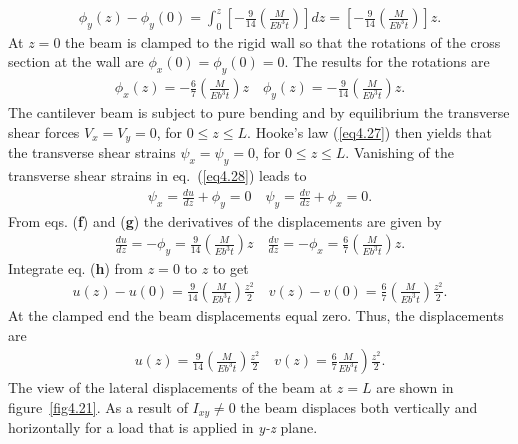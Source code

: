 \documentclass{AeroStructure-ERJohnson}
\begin{document}
\begin{example}
\begin{gather}
\phi_{y}(z)-\phi_{y}(0)=\int_{0}^{z}\left[-\frac{9}{14}\left(\frac{M}{E b^{3} t}\right)\right] d z=\left[-\frac{9}{14}\left(\frac{M}{E b^{3} t}\right)\right] z.\label{ex4.5e}
\end{gather}
At $z = $0 the beam is clamped to the rigid wall so that the rotations of the cross section at the wall are $\phi_{x}(0)=\phi_{y}(0)=0$. The results for the rotations are
\begin{align}\label{ex4.5f}
\phi_{x}(z)=-\frac{6}{7}\left(\frac{M}{E b^{3} t}\right) z \quad \phi_{y}(z)=-\frac{9}{14}\left(\frac{M}{E b^{3} t}\right) z.
\end{align}
The cantilever beam is subject to pure bending and by equilibrium the transverse shear forces $V_{x}=V_{y}=0$, for $0 \leq z \leq L$. Hooke's law (\ref{eq4.27}) then yields that the transverse shear strains $\psi_{x}=\psi_{y}=0$, for $0 \leq z \leq L$. Vanishing of the transverse shear strains in eq.~(\ref{eq4.28}) leads to
\begin{align}\label{ex4.5g}
\psi_{x}=\frac{d u}{d z}+\phi_{y}=0 \quad \psi_{y}=\frac{d v}{d z}+\phi_{x}=0.
\end{align}
From eqs. (\textbf{f}) and (\textbf{g}) the derivatives of the displacements are given by
\begin{align}\label{ex4.5h}
\frac{d u}{d z}=-\phi_{y}=\frac{9}{14}\left(\frac{M}{E b^{3} t}\right) z \quad \frac{d v}{d z}=-\phi_{x}=\frac{6}{7}\left(\frac{M}{E b^{3} t}\right) z.
\end{align}
Integrate eq. (\textbf{h}) from $z=0$ to $z$ to get
\begin{align}\label{ex4.5i}
u(z)-u(0)=\frac{9}{14}\left(\frac{M}{E b^{3} t}\right) \frac{z^{2}}{2} \quad v(z)-v(0)=\frac{6}{7}\left(\frac{M}{E b^{3} t}\right) \frac{z^{2}}{2}.
\end{align}
At the clamped end the beam displacements equal zero. Thus, the displacements are
\begin{align}\label{ex4.5j}
\left.u(z)=\frac{9}{14}\left(\frac{M}{E b^{3} t}\right) \frac{z^{2}}{2} \quad v(z)=\frac{6}{7} \frac{M}{E b^{3} t}\right) \frac{z^{2}}{2}.
\end{align}
The view of the lateral displacements of the beam at $z=L$ are shown in figure~\ref{fig4.21}. As a result of $I_{x y} \neq 0$ the beam displaces both vertically and horizontally for a load that is applied in \textit{y-z} plane.
\end{example}
\end{document}
